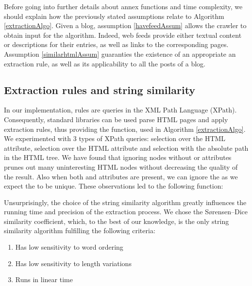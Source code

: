 Before going into further details about annex functions and time complexity, we should explain how the previously stated assumptions relate to Algorithm \ref{extractionAlgo}. Given a blog, assumption \ref{havefeedAssum} allows the crawler to obtain input for the algorithm. Indeed, web feeds provide either textual content or descriptions for their entries, as well as links to the corresponding pages. Assumption \ref{similarhtmlAssum} guaranties the existence of an appropriate an extraction rule, as well as its applicability to all the posts of a blog.

\subsection{Extraction rules and string similarity}
In our implementation, rules are queries in the XML Path Language (XPath). Consequently, standard libraries can be used parse HTML pages and apply extraction rules, thus providing the  function, used in Algorithm \ref{extractionAlgo}. We experimented with 3 types of XPath queries: selection over the HTML  attribute, selection over the HTML  attribute and selection with the absolute path in the HTML tree. We have found that ignoring nodes without  or  attributes prunes out many uninteresting HTML nodes without decreasing the quality of the result. Also when both  and  attributes are present, we can ignore the  as we expect the  to be unique. These observations led to the following  function:

\allrulesAlgo

Unsurprisingly, the choice of the string similarity algorithm greatly influences the running time and precision of the extraction process. We chose the Sørensen–Dice similarity coefficient\cite{dice1945}, which, to the best of our knowledge, is the only string similarity algorithm fulfilling the following criteria:

\begin{enumerate}
  \item\label{wordorderProp} Has low sensitivity to word ordering
  \item\label{lengthProp} Has low sensitivity to length variations
  \item\label{linearProp} Runs in linear time
\end{enumerate}

